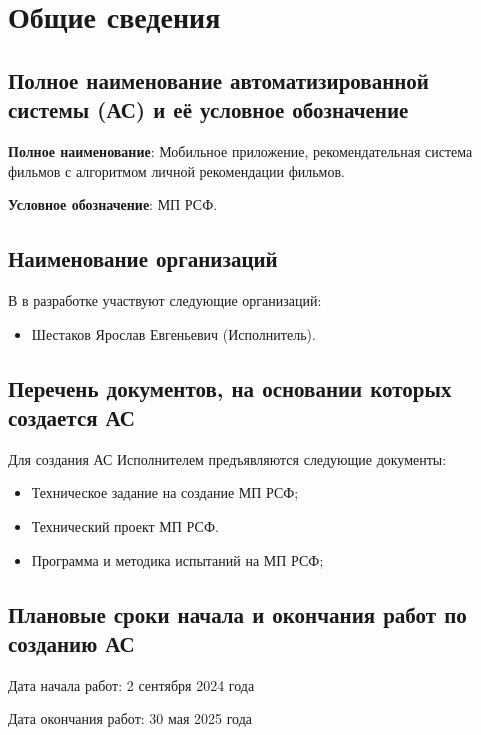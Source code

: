 \section{Общие сведения}

\subsection{Полное наименование автоматизированной системы (АС)
	и её условное обозначение}

\textbf{Полное наименование}:
Мобильное приложение, рекомендательная система фильмов с алгоритмом личной рекомендации фильмов.

\textbf{Условное обозначение}: МП РСФ.

\subsection{Наименование организаций}

В в разработке участвуют следующие организаций:

\begin{itemize}
	\item Шестаков Ярослав Евгеньевич (Исполнитель).
\end{itemize}

\subsection{Перечень документов, на основании которых создается АС}

Для создания АС Исполнителем предъявляются следующие документы:

\begin{itemize}
	\item Техническое задание на создание МП РСФ;
	\item Технический проект МП РСФ.
	\item Программа и методика испытаний на МП РСФ;
\end{itemize}

\subsection{Плановые сроки начала и окончания работ по созданию АС}

Дата начала работ: 2 сентября 2024 года

Дата окончания работ: 30 мая 2025 года

